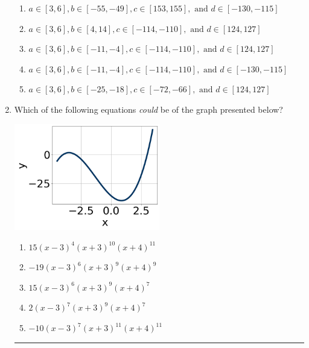 \documentclass[14pt]{extbook}
\newcommand{\litem}[1]{\item#1\hspace*{-1cm}\rule{\textwidth}{0.4pt}}
\begin{document}
\begin{enumerate}
{\begin{enumerate}[label=\Alph*.]
\item \( a \in [3, 6], b \in [-55, -49], c \in [153, 155], \text{ and } d \in [-130, -115] \)
\item \( a \in [3, 6], b \in [4, 14], c \in [-114, -110], \text{ and } d \in [124, 127] \)
\item \( a \in [3, 6], b \in [-11, -4], c \in [-114, -110], \text{ and } d \in [124, 127] \)
\item \( a \in [3, 6], b \in [-11, -4], c \in [-114, -110], \text{ and } d \in [-130, -115] \)
\item \( a \in [3, 6], b \in [-25, -18], c \in [-72, -66], \text{ and } d \in [124, 127] \)

\end{enumerate} }
\litem{
Which of the following equations \textit{could} be of the graph presented below?
\begin{center}
    \includegraphics[width=0.5\textwidth]{../Figures/polyGraphToFunctionCopyB.png}
\end{center}
\begin{enumerate}[label=\Alph*.]
\item \( 15(x - 3)^{4} (x + 3)^{10} (x + 4)^{11} \)
\item \( -19(x - 3)^{6} (x + 3)^{9} (x + 4)^{9} \)
\item \( 15(x - 3)^{6} (x + 3)^{9} (x + 4)^{7} \)
\item \( 2(x - 3)^{7} (x + 3)^{9} (x + 4)^{7} \)
\item \( -10(x - 3)^{7} (x + 3)^{11} (x + 4)^{11} \)


\end{enumerate}}
\end{enumerate}
\end{document}
